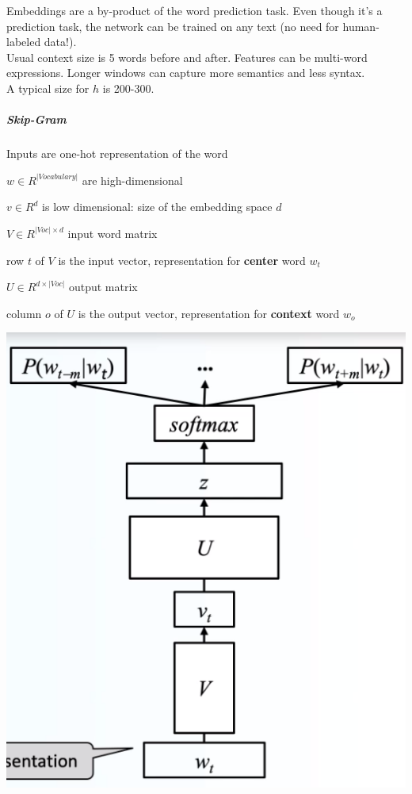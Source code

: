 \documentclass[10pt]{report}
\begin{document}
Embeddings are a by-product of the word prediction task. Even though it's a prediction task, the network can be trained on any text (no need for human-labeled data!).\\
Usual context size is 5 words before and after. Features can be multi-word expressions. Longer windows can capture more semantics and less syntax.\\
A typical size for $h$ is 200-300.
\subparagraph{Skip-Gram}
\begin{multicols}{2}
\begin{list}{}{}
	\item Inputs are one-hot representation of the word
	\item $w\in R^{|Vocabulary|}$ are high-dimensional
	\item $v\in R^d$ is low dimensional: size of the embedding space $d$
	\item $V\in R^{|Voc|\times d}$ input word matrix
	\item row $t$ of $V$ is the input vector, representation for \textbf{center} word $w_t$
	\item $U\in R^{d\times|Voc|}$ output matrix
	\item column $o$ of $U$ is the output vector, representation for \textbf{context} word $w_o$
\end{list}
\columnbreak
\begin{center}
	\includegraphics[scale=0.35]{5.png}
\end{center}
\end{multicols}
\end{document}
